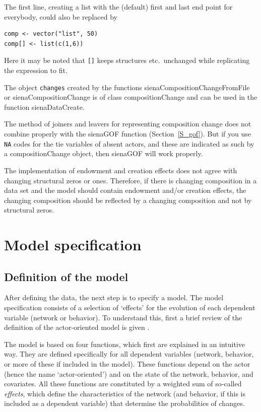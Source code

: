 \documentclass[a4paper,fleqn,11pt]{article}
\newcommand{\+}{\, + \,}
\newcommand{\sfn}[1]{\textsf{#1}}
\begin{document}
The first line, creating a list with the (default) first and
last end point for everybody, could also be replaced by
\begin{verbatim}
comp <- vector("list", 50)
comp[] <- list(c(1,6))
\end{verbatim}
Here it may be noted that \texttt{[]} keeps structures etc.\ unchanged
while replicating the expression to fit.

The object \texttt{changes} created by the functions
\sfn{sienaCompositionChangeFromFile} or
\sfn{sienaCompositionChange} is of class
\sfn{compositionChange} and can be used in the function
\textsf{sienaDataCreate}.

The method of joiners and leavers for representing composition change
does not combine properly with the \textsf{sienaGOF} function
(Section~\ref{S_gof}).
But if you use \texttt{NA} codes for the tie variables of absent actors,
and these are indicated as such by a \sfn{compositionChange} object, then
\textsf{sienaGOF}  will work properly.

The implementation of endowment and creation effects does not agree
with changing structural zeros or ones. Therefore, if there is
changing composition in a data set and the model should contain endowment
and/or creation effects, the changing composition should be reflected by
a changing composition and not by structural zeros.


\newpage
\section{Model specification}
\label{S_modspec}

\subsection{Definition of the model}
\label{S_defmod}

After defining the data, the next step is to specify a model.
The model specification consists of a selection of `effects'
for the evolution of each dependent variable (network or behavior).
To understand this, first a brief review of the definition of the
actor-oriented model is given
\citep*[for further explanations see][]{Snijders01, Snijders05,
SnijdersEA07, SnijdersEA10b}.

The model is based on four functions, which first are explained in an
intuitive way.
They are defined specifically for all dependent variables (network, behavior,
or more of these if included in the model).
These functions depend on the actor (hence the name `actor-oriented')
and on the state of the network, behavior, and covariates.
All these functions are constituted by a weighted sum
of so-called \emph{effects}, which define the characteristics of
the network (and behavior, if this is included as a dependent variable)
that determine the probabilities of changes.
\end{document}
